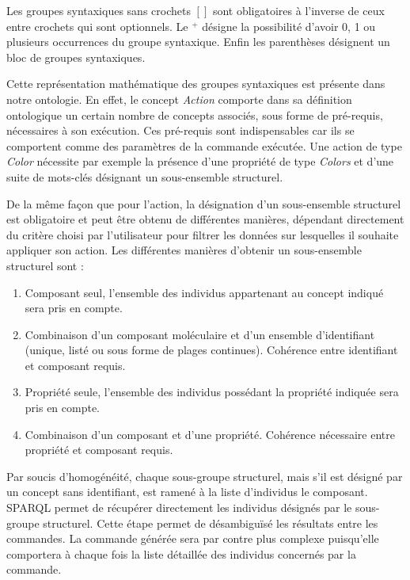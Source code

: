 Les groupes syntaxiques sans crochets $[]$ sont obligatoires à l'inverse de ceux entre crochets qui sont optionnels. Le $^+$ désigne la possibilité d'avoir 0, 1 ou plusieurs occurrences du groupe syntaxique. Enfin les parenthèses désignent un bloc de groupes syntaxiques.

Cette représentation mathématique des groupes syntaxiques est présente dans notre ontologie. En effet, le concept \textit{Action} comporte dans sa définition ontologique un certain nombre de concepts associés, sous forme de pré-requis, nécessaires à son exécution. Ces pré-requis sont indispensables car ils se comportent comme des paramètres de la commande exécutée. Une action de type \textit{Color} nécessite par exemple la présence d'une propriété de type \textit{Colors} et d'une suite de mots-clés désignant un sous-ensemble structurel. 

De la même façon que pour l'action, la désignation d'un sous-ensemble structurel est obligatoire et peut être obtenu de différentes manières, dépendant directement du critère choisi par l'utilisateur pour filtrer les données sur lesquelles il souhaite appliquer son action. Les différentes manières d'obtenir un sous-ensemble structurel sont :

\begin{enumerate}
  \item Composant seul, l'ensemble des individus appartenant au concept indiqué sera pris en compte.
  \item Combinaison d'un composant moléculaire et d'un ensemble d'identifiant (unique, listé ou sous forme de plages continues). Cohérence entre identifiant et composant requis.
  \item Propriété seule, l'ensemble des individus possédant la propriété indiquée sera pris en compte.
  \item Combinaison d'un composant et d'une propriété. Cohérence nécessaire entre propriété et composant requis.
\end{enumerate}

Par soucis d'homogénéité, chaque sous-groupe structurel, mais s'il est désigné par un concept sans identifiant, est ramené à la liste d'individus le composant. SPARQL permet de récupérer directement les individus désignés par le sous-groupe structurel. Cette étape permet de désambiguïsé les résultats entre les commandes. La commande générée sera par contre plus complexe puisqu'elle comportera à chaque fois la liste détaillée des individus concernés par la commande.

